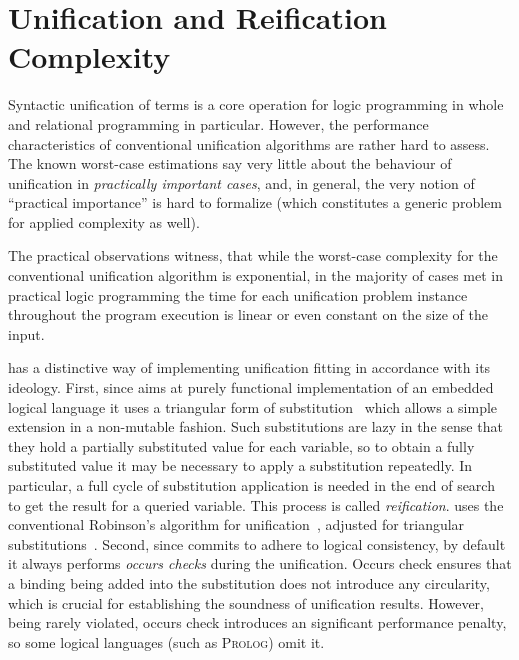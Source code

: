 \section{Unification and Reification Complexity}
\label{sec:uni-rei}

Syntactic unification of terms is a core operation for logic programming in whole and relational programming in particular.
However, the performance characteristics of conventional unification algorithms are rather hard to assess.
The known worst-case estimations say very little about the behaviour of unification in \emph{practically important cases}, and, in
general, the very notion of ``practical importance'' is hard to formalize (which constitutes a generic problem for applied complexity as well).

The practical observations witness, that while the worst-case complexity for the conventional unification algorithm is exponential, in the majority of
cases met in practical logic programming the time for each unification problem instance throughout the program execution is linear or even constant on the size of the input.


\mK has a distinctive way of implementing unification fitting in accordance with its ideology. First, since \mK aims at purely functional implementation of an embedded logical
language it uses a triangular form of substitution~\cite{UnificationTheory} which allows a simple extension in a non-mutable fashion. Such substitutions are lazy in the sense that
they hold a partially substituted value for each variable, so to obtain a fully substituted value it may be necessary to apply a substitution repeatedly. In particular, a full
cycle of substitution application is needed in the end of search to get the result for a queried variable. This process is called \emph{reification}. \mK uses the conventional Robinson's
algorithm for unification~\cite{RobinsonsAlgorithm}, adjusted for triangular substitutions~\cite{TRS}. Second, since \mK commits to adhere to logical consistency, by default it always
performs \emph{occurs checks} during the unification. Occurs check ensures that a binding being added into the substitution does not introduce any circularity, which is crucial for
establishing the soundness of unification results. However, being rarely violated, occurs check introduces an significant performance penalty, so some logical languages (such as \textsc{Prolog})
omit it.

